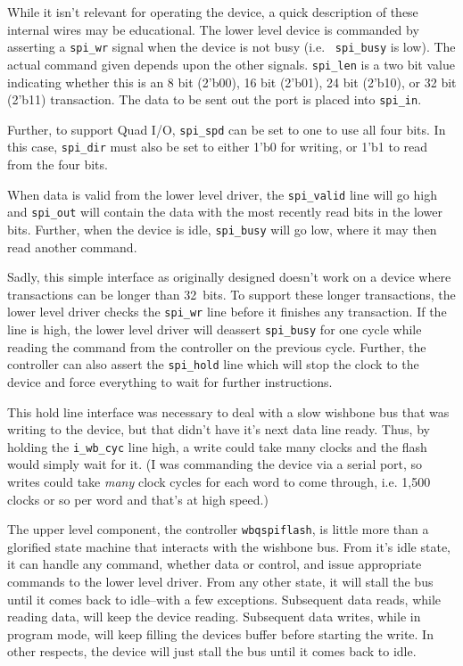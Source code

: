 \documentclass{gqtekspec}
\begin{document}
While it isn't relevant for operating the device, a quick description of these
internal wires may be educational.  The lower level device is commanded by
asserting a {\tt spi\_wr} signal when the device is not busy (i.e. {\tt 
spi\_busy} is low).  The actual command given depends upon the other
signals.  {\tt spi\_len} is a two bit value indicating whether this is an
8 bit (2'b00), 16 bit (2'b01), 24 bit (2'b10), or 32 bit (2'b11) transaction.
The data to be sent out the port is placed into {\tt spi\_in}. 

Further, to support Quad I/O, {\tt spi\_spd} can be set to one to use all four
bits.  In this case, {\tt spi\_dir} must also be set to either 1'b0 for
writing, or 1'b1 to read from the four bits.

When data is valid from the lower level driver, the {\tt spi\_valid} line
will go high and {\tt spi\_out} will contain the data with the most recently
read bits in the lower bits.  Further, when the device is idle, {\tt spi\_busy}
will go low, where it may then read another command.

Sadly, this simple interface as originally designed doesn't work on a 
device where transactions can be longer than 32~bits.  To support these
longer transactions, the lower level driver checks the {\tt spi\_wr} line
before it finishes any transaction.  If the line is high, the lower level
driver will deassert {\tt spi\_busy} for one cycle while reading the command
from the controller on the previous cycle.  Further, the controller can also
assert the {\tt spi\_hold} line which will stop the clock to the device
and force everything to wait for further instructions.

This hold line interface was necessary to deal with a slow wishbone bus that
was writing to the device, but that didn't have it's next data line ready.
Thus, by holding the {\tt i\_wb\_cyc} line high, a write could take many
clocks and the flash would simply wait for it.  (I was commanding the device
via a serial port, so writes could take {\em many} clock cycles for each
word to come through, i.e. 1,500 clocks or so per word and that's at high
speed.)

The upper level component, the controller {\tt wbqspiflash}, is little more
than a glorified state machine that interacts with the wishbone bus.  
From it's idle state, it can handle any command, whether data or control,
and issue appropriate commands to the lower level driver.  From any other
state, it will stall the bus until it comes back to idle--with a few exceptions.
Subsequent data reads, while reading data, will keep the device reading.
Subsequent data writes, while in program mode, will keep filling the devices
buffer before starting the write.  In other respects, the device will just
stall the bus until it comes back to idle.
\end{document}
